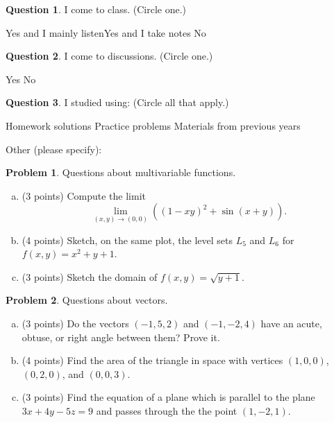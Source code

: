 \documentclass[11pt,oneside]{amsart}
\theoremstyle{definition}
\newtheorem{problem}{Problem}
\newtheorem{question}{Question}
\theoremstyle{plain}
\begin{document}
\begin{question}
  I come to class. (Circle one.)

  \hspace{1.5cm}Yes and I mainly listen\hspace{1.5cm}Yes and I take notes\hspace{1.5cm} No
\end{question}

\begin{question}
  I come to discussions. (Circle one.)

  \hspace{1.5cm}Yes\hspace{1.5cm} No
\end{question}

\begin{question}
  I studied using: (Circle all that apply.)

  \hspace{1.5cm}Homework solutions\hspace{0.05\textwidth} Practice problems\hspace{0.05\textwidth} Materials from previous years

  \hspace{1.5cm}Other (please specify): \underline{\hspace{8cm}}
\end{question}

\newpage

\begin{problem}
  Questions about multivariable functions.
  \begin{enumerate}[(a)]
    \item (3 points) Compute the limit
    \[\lim_{(x,y)\to (0,0)}((1-xy)^2+\sin(x+y)).\]
    \vfill
    \item (4 points) Sketch, on the same plot, the level sets $L_5$ and $L_6$ for $f(x,y)=x^2+y+1$.
    \vfill
    \vfill
    \item (3 points) Sketch the domain of $f(x,y)=\sqrt{y+1}$.
    \vfill
  \end{enumerate}
\end{problem}

\newpage

\begin{problem}
  Questions about vectors.
  \begin{enumerate}[(a)]
    \item (3 points) Do the vectors $(-1,5,2)$ and $(-1,-2,4)$ have an acute, obtuse, or right angle between them? Prove it.
    \vfill
    \item (4 points) Find the area of the triangle in space with vertices $(1,0,0)$, $(0,2,0)$, and $(0,0,3)$.
    \vfill
    \item (3 points) Find the equation of a plane which is parallel to the plane $3x+4y-5z=9$ and passes through the the point $(1,-2,1)$.
    \vfill
  \end{enumerate}
\end{problem}
\end{document}
